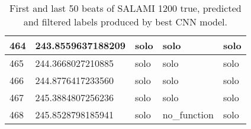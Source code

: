 \begin{table}[t]
\begin{tabular}{|l|l|l|l|l|}
    464           & 243.8559637188209  & solo                & solo                     & solo                    \\ \hline
    465           & 244.3668027210885  & solo                & solo                     & solo                    \\ \hline
    466           & 244.8776417233560  & solo                & solo                     & solo                    \\ \hline
    467           & 245.3884807256236  & solo                & solo                     & solo                    \\ \hline
    468           & 245.8528798185941  & solo                & no\_function             & solo                    \\ \hline
    \end{tabular}
    \caption{First and last 50 beats of SALAMI 1200 true, predicted and filtered labels produced by best CNN model.}
    \label{tab:1200_cnn}
\end{table}